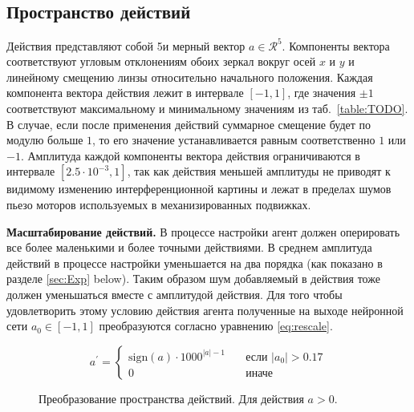 \subsection{Пространство действий}

Действия представляют собой 5и мерный вектор $a \in \mathcal{R}^5$. Компоненты вектора соответствуют угловым отклонениям обоих зеркал вокруг осей $x$ и $y$ и линейному смещению линзы относительно начального положения. Каждая компонента вектора действия лежит в интервале $[-1,1]$, где значения $\pm 1$ соответствуют максимальному и минимальному значениям из таб.~\ref{table:TODO}. В случае, если после применения действий суммарное смещение будет по модулю больше $1$, то его значение устанавливается равным соответственно $1$ или $-1$.
Амплитуда каждой компоненты вектора действия ограничиваются в интервале $[2.5 \cdot 10^{-3}, 1]$, так как действия меньшей амплитуды не приводят к видимому изменению интерференционной картины и лежат в пределах шумов пьезо моторов используемых в механизированных подвижках.

\textbf{Масштабирование действий.} 
В процессе настройки агент должен оперировать все более маленькими и более точными действиями. В среднем амплитуда действий в процессе настройки уменьшается на два порядка (как показано в разделе \ref{sec:Exp} below). Таким образом шум добавляемый в действия тоже должен уменьшаться вместе с амплитудой действия. Для того чтобы удовлетворить этому условию действия агента полученные на выходе нейронной сети  $a_0\in[-1,1]$ преобразуются согласно уравнению \ref{eq:rescale}. 

\begin{equation}
a^{\prime} =
   \begin{cases}
    {\mathrm{sign}}(a) \cdot 1000^{|a| - 1}  & \quad \text{если $|a_0| > 0.17$} 
    \\
    0  & \quad \text{иначе}
  \end{cases}
\label{eq:rescale}
\end{equation}

\begin{figure}[ht]
\caption{Преобразование пространства действий. Для действия $a > 0$.}
\label{fig:rescale}
\end{figure}

